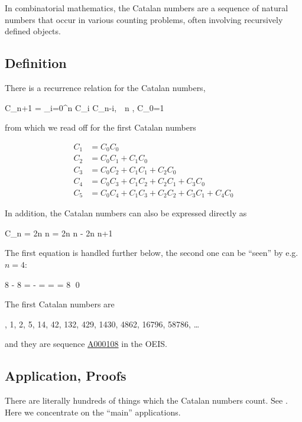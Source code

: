 
In combinatorial mathematics, the Catalan numbers are a sequence of natural numbers that occur in various counting problems, often involving recursively defined objects.

\subsection{Definition}

There is a recurrence relation for the Catalan numbers,

\be\label{2022-06-15:eq1}
C_{n+1} = \sum_{i=0}^n C_i C_{n-i}, \,\, n , \quad C_0=1
\ee

from which we read off for the first Catalan numbers

\begin{align*}
  C_1 &= C_0 C_0 \\
  C_2 &= C_0 C_1 + C_1 C_0 \\
  C_3 &= C_0 C_2 + C_1 C_1 + C_2 C_0 \\
  C_4 &= C_0 C_3 + C_1 C_2 + C_2 C_1 + C_3 C_0 \\
  C_5 &= C_0 C_4 + C_1 C_3 + C_2 C_2 + C_3 C_1 + C_4 C_0
\end{align*}

In addition, the Catalan numbers can also be expressed directly as

\be\label{2022-06-15:eq2}
C_n =  {2n \choose n} = {2n \choose n} - {2n \choose n+1}
\ee

The first equation is handled further below, the second one can be ``seen'' by e.g. $n=4$:

\bee
{8 } - {8 } =  -  =  =    = {8 }  \qed
\eee

The first Catalan numbers are

, 1, 2, 5, 14, 42, 132, 429, 1430, 4862, 16796, 58786, \ldots
\eee

and they are sequence \href{https://oeis.org/A000108}{A000108} in the OEIS.

\subsection{Application, Proofs}

There are literally hundreds of things which the Catalan numbers count. See \cite{Stanley2015}. Here we concentrate on the ``main'' applications.

